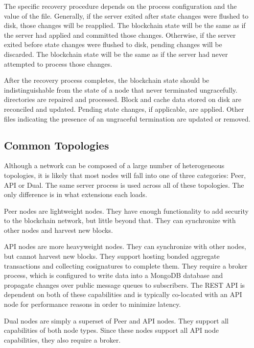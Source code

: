 The specific recovery procedure depends on the process configuration and the value of the  file.
Generally, if the server exited after state changes were flushed to disk, those changes will be reapplied.
The blockchain state will be the same as if the server had applied and committed those changes.
Otherwise, if the server exited before state changes were flushed to disk, pending changes will be discarded.
The blockchain state will be the same as if the server had never attempted to process those changes.

After the recovery process completes, the blockchain state should be indistinguishable from the state of a node that never terminated ungracefully.
 directories are repaired and processed.
Block and cache data stored on disk are reconciled and updated.
Pending state changes, if applicable, are applied.
Other files indicating the presence of an ungraceful termination are updated or removed.

\subsection{Common Topologies}

Although a network can be composed of a large number of heterogeneous topologies, it is likely that most nodes will fall into one of three categories: Peer, API or Dual.
The same server process is used across all of these topologies.
The only difference is in what extensions each loads.

Peer nodes are lightweight nodes.
They have enough functionality to add security to the blockchain network, but little beyond that.
They can synchronize with other nodes and harvest new blocks.

API nodes are more heavyweight nodes.
They can synchronize with other nodes, but cannot harvest new blocks.
They support hosting bonded aggregate transactions and collecting cosignatures to complete them.
They require a broker process, which is configured to write data into a MongoDB database and propagate changes over public message queues to subscribers.
The REST API is dependent on both of these capabilities and is typically co-located with an API node for performance reasons in order to minimize latency.

Dual nodes are simply a superset of Peer and API nodes.
They support all capabilities of both node types.
Since these nodes support all API node capabilities, they also require a broker.
